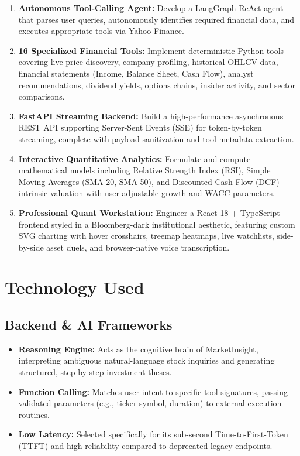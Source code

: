 \documentclass[12pt,a4paper]{report}
\begin{document}
\begin{enumerate}[leftmargin=*,label=\textbf{\arabic*.}]
  \item \textbf{Autonomous Tool-Calling Agent:} Develop a LangGraph ReAct agent that parses user queries, autonomously identifies required financial data, and executes appropriate tools via Yahoo Finance.
  \item \textbf{16 Specialized Financial Tools:} Implement deterministic Python tools covering live price discovery, company profiling, historical OHLCV data, financial statements (Income, Balance Sheet, Cash Flow), analyst recommendations, dividend yields, options chains, insider activity, and sector comparisons.
  \item \textbf{FastAPI Streaming Backend:} Build a high-performance asynchronous REST API supporting Server-Sent Events (SSE) for token-by-token streaming, complete with payload sanitization and tool metadata extraction.
  \item \textbf{Interactive Quantitative Analytics:} Formulate and compute mathematical models including Relative Strength Index (RSI), Simple Moving Averages (SMA-20, SMA-50), and Discounted Cash Flow (DCF) intrinsic valuation with user-adjustable growth and WACC parameters.
  \item \textbf{Professional Quant Workstation:} Engineer a React 18 + TypeScript frontend styled in a Bloomberg-dark institutional aesthetic, featuring custom SVG charting with hover crosshairs, treemap heatmaps, live watchlists, side-by-side asset duels, and browser-native voice transcription.
\end{enumerate}

\clearpage
\chapter{Technology Used}

\section{Backend \& AI Frameworks}

\begin{techbox}[title=Google Gemini LLM (\texttt{gemini-flash-lite-latest})]
\begin{itemize}[leftmargin=*]
  \item \textbf{Reasoning Engine:} Acts as the cognitive brain of MarketInsight, interpreting ambiguous natural-language stock inquiries and generating structured, step-by-step investment theses.
  \item \textbf{Function Calling:} Matches user intent to specific tool signatures, passing validated parameters (e.g., ticker symbol, duration) to external execution routines.
  \item \textbf{Low Latency:} Selected specifically for its sub-second Time-to-First-Token (TTFT) and high reliability compared to deprecated legacy endpoints.
\end{itemize}
\end{techbox}
\end{document}
